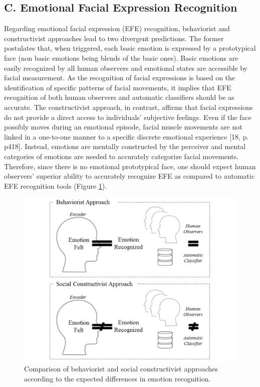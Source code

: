 \documentclass[conference,final,]{IEEEtran}
\makeatletter
\def\maxwidth{\ifdim\Gin@nat@width>\linewidth\linewidth
\else\Gin@nat@width\fi}
\let\Oldincludegraphics\includegraphics
\renewcommand{\includegraphics}[1]{\Oldincludegraphics[width=\maxwidth]{#1}}
\makeatother
\begin{document}
\hypertarget{c.-emotional-facial-expression-recognition}{%
\subsection{C. Emotional Facial Expression
Recognition}\label{c.-emotional-facial-expression-recognition}}

Regarding emotional facial expression (EFE) recognition, behaviorist and
constructivist approaches lead to two divergent predictions. The former
postulates that, when triggered, each basic emotion is expressed by a
prototypical face (non basic emotions being blends of the basic ones).
Basic emotions are easily recognized by all human observers and
emotional states are accessible by facial measurement. As the
recognition of facial expressions is based on the identification of
specific patterns of facial movements, it implies that EFE recognition
of both human observers and automatic classifiers should be as accurate.
The constructivist approach, in contrast, affirms that facial
expressions do not provide a direct access to individuals' subjective
feelings. Even if the face possibly moves during an emotional episode,
facial muscle movements are not linked in a one-to-one manner to a
specific discrete emotional experience {[}18, p. p418{]}. Instead,
emotions are mentally constructed by the perceiver and mental categories
of emotions are needed to accurately categorize facial movements.
Therefore, since there is no emotional prototypical face, one should
expect human observers' superior ability to accurately recognize EFE as
compared to automatic EFE recognition tools (Figure
\ref{fig:models_img}).

\begin{figure}
\centering
\includegraphics{ACII_2019_paper_files/figure-latex/models_img-1.pdf}
\caption{\label{fig:models_img}Comparison of behaviorist and social
constructivist approaches according to the expected differences in
emotion recognition.}
\end{figure}
\end{document}
